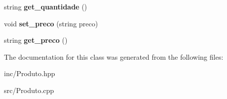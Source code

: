 \begin{DoxyCompactItemize}
\item 
string {\bfseries get\+\_\+quantidade} ()\hypertarget{class_produto_a5139aab83ed7e79e80a50b3f0099e072}{}\label{class_produto_a5139aab83ed7e79e80a50b3f0099e072}

\item 
void {\bfseries set\+\_\+preco} (string preco)\hypertarget{class_produto_a5e71ed00267a2b4b8617ccf1c06ab258}{}\label{class_produto_a5e71ed00267a2b4b8617ccf1c06ab258}

\item 
string {\bfseries get\+\_\+preco} ()\hypertarget{class_produto_ad531cb3d2629b04e8fca7e9a4d72fb88}{}\label{class_produto_ad531cb3d2629b04e8fca7e9a4d72fb88}

\end{DoxyCompactItemize}


The documentation for this class was generated from the following files\+:\begin{DoxyCompactItemize}
\item 
inc/Produto.\+hpp\item 
src/Produto.\+cpp\end{DoxyCompactItemize}

